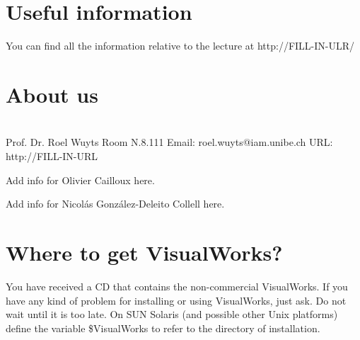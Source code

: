 \ifx\wholebook\relax\else


\fi


\section*{Useful information}
You can find all the information relative to the lecture at 
http://FILL-IN-ULR/


\section*{About us}
\begin{code}
 \\
Prof. Dr. Roel Wuyts
Room N.8.111
Email: 	roel.wuyts@iam.unibe.ch
URL:  http://FILL-IN-URL
\end{code}
\begin{code}
Add info for Olivier Cailloux here.
\end{code}
\begin{code}
Add info for Nicol\'as Gonz\'alez-Deleito Collell here.
\end{code}

\section*{Where to get VisualWorks?}
You have received a CD that contains the non-commercial VisualWorks.
If you have any kind of problem for installing or using VisualWorks, just ask. Do not wait until it is too late. On SUN Solaris (and possible other Unix platforms) define the variable \$VisualWorks to refer to the directory of installation.


\ifx\wholebook\relax\else\fi
